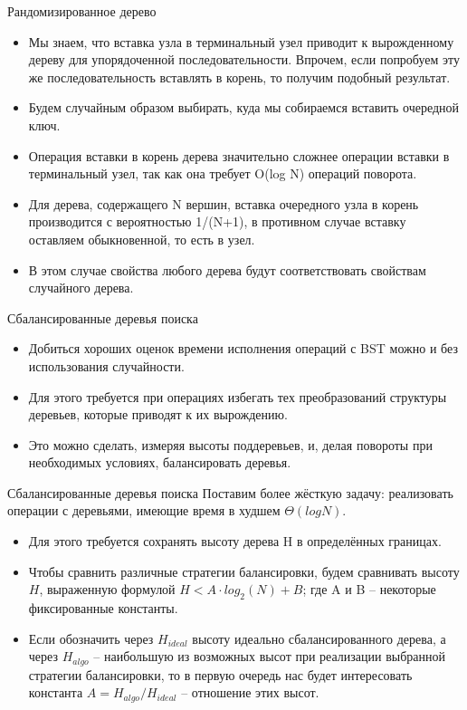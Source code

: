 \documentclass{beamer}
\begin{document}
\begin{frame}[fragile]{Рандомизированное дерево}
	\begin{itemize}
		\item Мы знаем, что вставка узла в терминальный узел приводит к вырожденному дереву для упорядоченной последовательности. Впрочем, если попробуем эту же последовательность вставлять в корень, то получим подобный результат. 
		\item Будем случайным образом выбирать, куда мы собираемся вставить очередной ключ. 
		\item Операция вставки в корень дерева значительно сложнее операции вставки в терминальный узел, так как она требует O(log N) операций поворота. 
		\item Для дерева, содержащего N вершин, вставка очередного узла в корень производится с вероятностью 1/(N+1), в противном случае вставку оставляем обыкновенной, то есть в узел. 
		\item В этом случае свойства любого дерева будут соответствовать свойствам случайного дерева.
	\end{itemize}
\end{frame}

\begin{frame}[fragile]{Сбалансированные деревья поиска}
	\begin{itemize}
		\item Добиться хороших оценок времени исполнения операций с BST можно и без использования случайности. 
		\item Для этого требуется при операциях избегать тех преобразований структуры деревьев, которые приводят к их вырождению. 
		\item Это можно сделать, измеряя высоты поддеревьев, и, делая повороты при необходимых условиях, балансировать деревья.
	\end{itemize}
\end{frame}

\begin{frame}[fragile]{Сбалансированные деревья поиска}
	Поставим более жёсткую задачу: реализовать операции с деревьями, имеющие время в худшем $\Theta (log N)$.
	\begin{itemize}
		\item Для этого требуется сохранять высоту дерева H в определённых границах. 
		\item Чтобы сравнить различные стратегии балансировки, будем сравнивать высоту $H$, выраженную формулой $H < A \cdot log_2(N) + B$; где A и B -- некоторые фиксированные константы. 
		\item Если обозначить через $H_{ideal}$ высоту идеально сбалансированного дерева, а через $H_{algo}$ -- наибольшую из возможных высот при реализации выбранной стратегии балансировки, то в первую очередь нас будет интересовать константа 
		$A = H_{algo}/H_{ideal}$ -- отношение этих высот.
	\end{itemize}
\end{frame}
\end{document}
